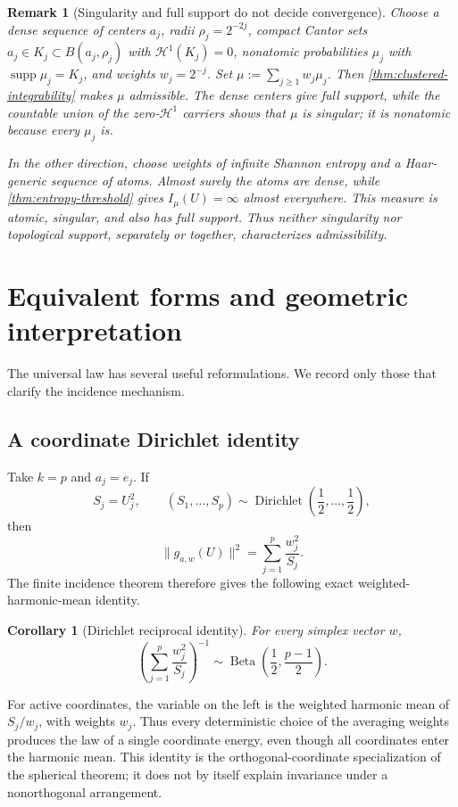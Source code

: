 \documentclass[11pt]{article}
\numberwithin{equation}{section}
\theoremstyle{thmstyleone}%
\newtheorem{corollary}[corollary]{Corollary}
\theoremstyle{thmstyletwo}%
\newtheorem*{remark}{Remark}%
\let\cref\autoref
\newcommand{\Beta}{\operatorname{Beta}}
\newcommand{\Dir}{\operatorname{Dirichlet}}
\begin{document}
\begin{remark}[Singularity and full support do not decide convergence]
\label{rem:full-support-counterexamples}
Choose a dense sequence of centers \(a_j\), radii
\(\rho_j=2^{-2j}\), compact Cantor sets
\(a_j\in K_j\subset B(a_j,\rho_j)\) with
\(\mathcal H^1(K_j)=0\), nonatomic
probabilities \(\mu_j\) with \(\operatorname{supp}\mu_j=K_j\), and weights
\(w_j=2^{-j}\).
Set \(\mu:=\sum_{j\geq1}w_j\mu_j\).
Then \cref{thm:clustered-integrability} makes \(\mu\) admissible.
The dense centers give full support, while the countable union of the
zero-\(\mathcal H^1\) carriers shows that \(\mu\) is singular; it is
nonatomic because every \(\mu_j\) is.

In the other direction, choose weights of infinite Shannon entropy and a
Haar-generic sequence of atoms.  Almost surely the atoms are dense, while
\cref{thm:entropy-threshold} gives \(I_\mu(U)=\infty\) almost everywhere.
This measure is atomic, singular, and also has full support.  Thus neither
singularity nor topological support, separately or together, characterizes
admissibility.
\end{remark}

\section{Equivalent forms and geometric interpretation}
\label{sec:equivalent-forms}

The universal law has several useful reformulations.  We record only those
that clarify the incidence mechanism.

\subsection{A coordinate Dirichlet identity}

Take \(k=p\) and \(a_j=e_j\).  If
\[
  S_j=U_j^2,
  \qquad
  (S_1,\ldots,S_p)\sim
  \Dir\!\left(\frac12,\ldots,\frac12\right),
\]
then
\[
  \|g_{a,w}(U)\|^2
  =
  \sum_{j=1}^p\frac{w_j^2}{S_j}.
\]
The finite incidence theorem therefore gives the following exact
weighted-harmonic-mean identity.

\begin{corollary}[Dirichlet reciprocal identity]
\label{cor:dirichlet-reciprocal}
For every simplex vector \(w\),
\[
  \left(\sum_{j=1}^p\frac{w_j^2}{S_j}\right)^{-1}
  \sim
  \Beta\!\left(\frac12,\frac{p-1}{2}\right).
\]
\end{corollary}

For active coordinates, the variable on the left is the weighted harmonic
mean of \(S_j/w_j\), with weights \(w_j\).  Thus every deterministic choice
of the averaging weights produces the law of a single coordinate energy,
even though all coordinates enter the harmonic mean.  This identity is the
orthogonal-coordinate specialization of the spherical theorem; it does not
by itself explain invariance under a nonorthogonal arrangement.
\end{document}
